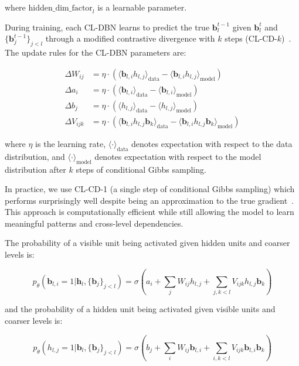 \documentclass[10pt,twocolumn,letterpaper]{article}
\newcommand{\bm}[1]{\boldsymbol{#1}}
\newcommand{\binary}{\bm{b}}
\begin{document}
where $\text{hidden\_dim\_factor}_l$ is a learnable parameter.

During training, each CL-DBN learns to predict the true $\binary_l^{t-1}$ given $\binary_l^t$ and $\{\binary_j^{t-1}\}_{j<l}$ through a modified contrastive divergence with $k$ steps (CL-CD-$k$)~\cite{hinton2002training}. The update rules for the CL-DBN parameters are:

\begin{align}
\Delta W_{ij} &= \eta \cdot (\langle \binary_{l,i} h_{l,j} \rangle_{\text{data}} - \langle \binary_{l,i} h_{l,j} \rangle_{\text{model}}) \\
\Delta a_i &= \eta \cdot (\langle \binary_{l,i} \rangle_{\text{data}} - \langle \binary_{l,i} \rangle_{\text{model}}) \\
\Delta b_j &= \eta \cdot (\langle h_{l,j} \rangle_{\text{data}} - \langle h_{l,j} \rangle_{\text{model}}) \\
\Delta V_{ijk} &= \eta \cdot (\langle \binary_{l,i} h_{l,j} \binary_{k} \rangle_{\text{data}} - \langle \binary_{l,i} h_{l,j} \binary_{k} \rangle_{\text{model}})
\end{align}

where $\eta$ is the learning rate, $\langle \cdot \rangle_{\text{data}}$ denotes expectation with respect to the data distribution, and $\langle \cdot \rangle_{\text{model}}$ denotes expectation with respect to the model distribution after $k$ steps of conditional Gibbs sampling.

In practice, we use CL-CD-1 (a single step of conditional Gibbs sampling) which performs surprisingly well despite being an approximation to the true gradient~\cite{hinton2002training}. This approach is computationally efficient while still allowing the model to learn meaningful patterns and cross-level dependencies.

The probability of a visible unit being activated given hidden units and coarser levels is:

\begin{equation}
p_\theta(\binary_{l,i} = 1 | \bm{h}_l, \{\binary_j\}_{j<l}) = \sigma \left( a_i + \sum_j W_{ij} h_{l,j} + \sum_{j,k<l} V_{ijk} h_{l,j} \binary_{k} \right)
\end{equation}

and the probability of a hidden unit being activated given visible units and coarser levels is:

\begin{equation}
p_\theta(h_{l,j} = 1 | \binary_l, \{\binary_j\}_{j<l}) = \sigma \left( b_j + \sum_i W_{ij} \binary_{l,i} + \sum_{i,k<l} V_{ijk} \binary_{l,i} \binary_{k} \right)
\end{equation}
\end{document}
